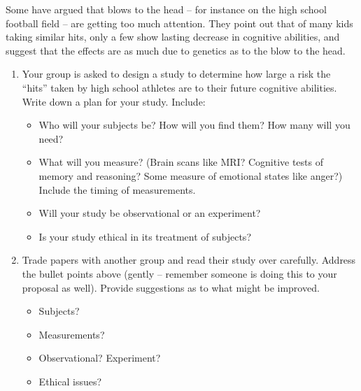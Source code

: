 Some have argued that blows to the head -- for instance on the
    high school football field -- are getting too much attention.
    They point out that of many kids taking similar hits, only a few
    show lasting decrease in cognitive abilities, and suggest that the
    effects are as  much due to genetics as to the blow to the head.
    \begin{enumerate}
    \item Your group is asked to design a study to
      determine how large a risk the ``hits'' taken by high school
      athletes are to their future cognitive abilities. Write down
      a plan for your study.  Include:
      \begin{itemize}
      \item Who will your subjects be?  How will you find them? How
        many will you need? 
      \item What will you measure? (Brain scans like MRI?  Cognitive
        tests of memory and reasoning?  Some measure of emotional
        states like anger?) Include the timing of measurements.
      \item Will your study be observational or an experiment?
      \item Is your study ethical in its treatment of subjects?
      \end{itemize}
   \newpage
      \vspace*{2.5in}

    \item Trade papers with another group and read their study over
      carefully. Address the bullet points above  (gently --
      remember someone is doing this to your proposal as well).
      Provide suggestions as to what might be improved.
      \begin{itemize}
      \item Subjects?
      \item Measurements?
      \item Observational? Experiment?
      \item Ethical issues?
      \end{itemize}
      \vspace{5in}

  



\end{enumerate}
